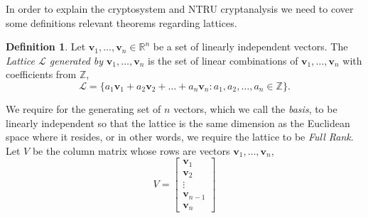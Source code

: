\documentclass[12pt]{amsart}
\theoremstyle{definition}
\newtheorem*{definition}{Definition}
\theoremstyle{remark}
\newcommand{\R}{\mathbb{R}}
\newcommand{\Z}{\mathbb{Z}}
\begin{document}
In order to explain the cryptosystem and NTRU cryptanalysis we need to cover some definitions relevant theorems regarding lattices. \cite{DecadeSum}
\begin{definition}\label{def:Lattice}
Let $\bm{v}_1,\dots,\bm{v}_n\in\R^n$ be a set of linearly independent vectors. The \textit{Lattice $\mathcal{L}$ generated by} $\bm{v}_1,\dots,\bm{v}_n$ is the set of linear combinations of $\bm{v}_1,\dots,\bm{v}_n$ with coefficients from $\Z$, $$\mathcal{L} = \{ a_1\bm{v}_1 + a_2\bm{v}_2 + \dots + a_n\bm{v}_n : a_1,a_2,\dots,a_n\in\Z\}.$$
\end{definition}

We require for the generating set of $n$ vectors, which we call the \textit{basis}, to be linearly independent so that the lattice is the same dimension as the Euclidean space where it resides, or in other words, we require the lattice to be \textit{Full Rank}.\\

Let $V$ be the column matrix whose rows are vectors $\bm{v}_1,\dots,\bm{v}_n$,
\begin{equation*}
    V = 
    \begin{bmatrix}
        \bm{v}_1\\
        \bm{v}_2\\
        \vdots\\
        \bm{v}_{n-1}\\
        \bm{v}_n
    \end{bmatrix}
\end{equation*}
\end{document}
